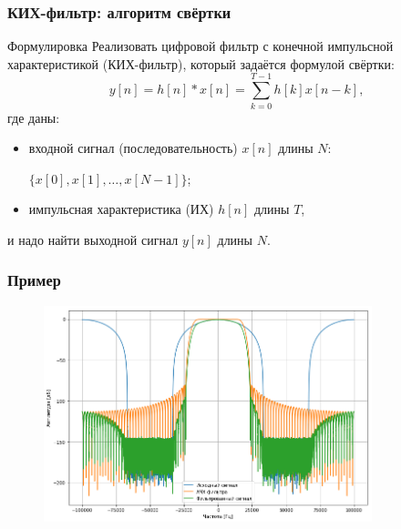 \documentclass{beamer}
\begin{document}
    \begin{frame}
        \frametitle{КИХ-фильтр: алгоритм свёртки}
        \begin{block}{Формулировка}
            \justifying
            Реализовать цифровой фильтр с конечной импульсной характеристикой (КИХ-фильтр), который задаётся формулой свёртки:
            \begin{equation}
                y[n] = h[n] * x[n] = \sum_{k=0}^{T - 1}h[k]x[n-k], \label{eq:conv}
            \end{equation}
            где даны:
            \begin{itemize}
                \justifying
                \item входной сигнал (последовательность) $x[n]$ длины $N$: 
                      \par
                      $\{x[0], x[1], \dotsc, x[N - 1]\}$;
                \item импульсная характеристика (ИХ) $h[n]$ длины $T$,
            \end{itemize}
            и надо найти выходной сигнал $y[n]$ длины $N$.
            \end{block}
    \end{frame}
    \begin{frame}
        \frametitle{Пример}
        \begin{figure}[!tbp]
           \centering
           \includegraphics[width=0.85\textwidth]{pics/conv_example.png}
           \captionsetup{justification=centering}
       \end{figure}
    \end{frame}
\end{document}
